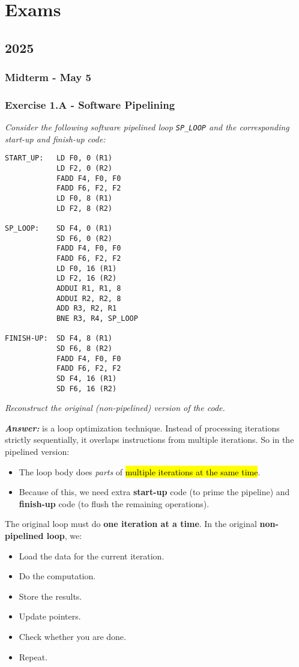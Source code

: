 \section{Exams}

\subsection{2025}

\subsubsection{Midterm - May 5}

\subsubsection*{Exercise 1.A - Software Pipelining}

\emph{Consider the following software pipelined loop \texttt{SP\_LOOP} and the corresponding start-up and finish-up code:}
\begin{lstlisting}
START_UP:   LD F0, 0 (R1)
            LD F2, 0 (R2)
            FADD F4, F0, F0
            FADD F6, F2, F2
            LD F0, 8 (R1)
            LD F2, 8 (R2)

SP_LOOP:    SD F4, 0 (R1)
            SD F6, 0 (R2)
            FADD F4, F0, F0
            FADD F6, F2, F2
            LD F0, 16 (R1)
            LD F2, 16 (R2)
            ADDUI R1, R1, 8
            ADDUI R2, R2, 8
            ADD R3, R2, R1
            BNE R3, R4, SP_LOOP

FINISH-UP:  SD F4, 8 (R1)
            SD F6, 8 (R2)
            FADD F4, F0, F0
            FADD F6, F2, F2
            SD F4, 16 (R1)
            SD F6, 16 (R2)
\end{lstlisting}
\emph{Reconstruct the original (non-pipelined) version of the code.}

\highspace
\textcolor{Green3}{\textbf{\emph{Answer:}}}  is a loop optimization technique. Instead of processing iterations strictly sequentially, it overlaps instructions from multiple iterations. So in the pipelined version:
\begin{itemize}
    \item The loop body does \emph{parts} of \hl{multiple iterations at the same time}.
    \item Because of this, we need extra \textbf{start-up} code (to prime the pipeline) and \textbf{finish-up} code (to flush the remaining operations).
\end{itemize}
The original loop must do \textbf{one iteration at a time}. In the original \textbf{non-pipelined loop}, we:
\begin{itemize}
    \item Load the data for the current iteration.
    \item Do the computation.
    \item Store the results.
    \item Update pointers.
    \item Check whether you are done.
    \item Repeat.
\end{itemize}


